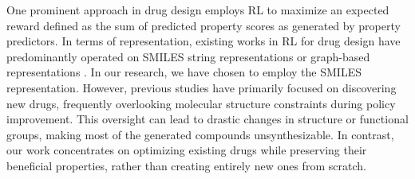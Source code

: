One prominent approach in drug design employs RL \citep{tan2022reinforcement} to maximize an expected reward defined as the sum of predicted property scores as generated by property predictors. 
In terms of representation, existing works in RL for drug design have predominantly operated on SMILES string representations \citep{born2021paccmannrl, guimaraes2017objective, neil2018exploring, olivecrona2017molecular, popova2018deep,  staahl2019deep,tan2022drlinker,wang2022reinforcement, zhang2023universal, zhou2019optimization} or graph-based representations \citep{atance2022novo,gottipati2020learning, jin2020multi,wu2022rlcg,you2018graph}.
In our research, we have chosen to employ the SMILES representation.
However, previous studies have primarily focused on discovering new drugs, frequently overlooking molecular structure constraints during policy improvement. This oversight can lead to drastic changes in structure or functional groups, making most of the generated compounds unsynthesizable. In contrast, our work concentrates on optimizing existing drugs while preserving their beneficial properties, rather than creating entirely new ones from scratch.










